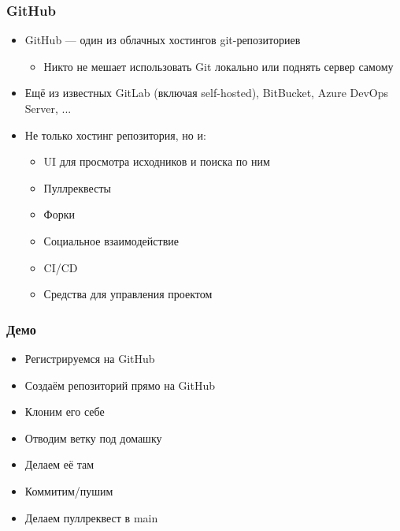 \documentclass{../slides-style}
\begin{document}
    \begin{frame}
        \frametitle{GitHub}
        \begin{itemize}
            \item GitHub --- один из облачных хостингов git-репозиториев
            \begin{itemize}
                \item Никто не мешает использовать Git локально или поднять сервер самому
            \end{itemize}
            \item Ещё из известных GitLab (включая self-hosted), BitBucket, Azure DevOps Server, ...
            \item Не только хостинг репозитория, но и:
            \begin{itemize}
                \item UI для просмотра исходников и поиска по ним
                \item Пуллреквесты
                \item Форки
                \item Социальное взаимодействие
                \item CI/CD
                \item Средства для управления проектом
            \end{itemize}
        \end{itemize}
    \end{frame}

    \begin{frame}
        \frametitle{Демо}
        \begin{itemize}
            \item Регистрируемся на GitHub
            \item Создаём репозиторий прямо на GitHub
            \item Клоним его себе
            \item Отводим ветку под домашку
            \item Делаем её там
            \item Коммитим/пушим
            \item Делаем пуллреквест в main
        \end{itemize}
    \end{frame}
\end{document}
